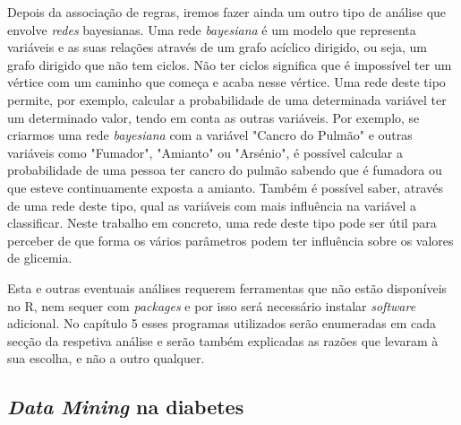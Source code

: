 Depois da associação de regras, iremos fazer ainda um outro tipo de análise que envolve \textit{redes} bayesianas. Uma rede \textit{bayesiana} é um modelo que representa variáveis e as suas relações através de um grafo acíclico dirigido, ou seja, um grafo dirigido que não tem ciclos. Não ter ciclos significa que é impossível ter um vértice com um caminho que começa e acaba nesse vértice. Uma rede deste tipo permite, por exemplo, calcular a probabilidade de uma determinada variável ter um determinado valor, tendo em conta as outras variáveis. Por exemplo, se criarmos uma rede \textit{bayesiana} com a variável "Cancro do Pulmão" e outras variáveis como "Fumador", "Amianto" ou "Arsénio", é possível calcular a probabilidade de uma pessoa ter cancro do pulmão sabendo que é fumadora ou que esteve continuamente exposta a amianto. Também é possível saber, através de uma rede deste tipo, qual as variáveis com mais influência na variável a classificar. Neste trabalho em concreto, uma rede deste tipo pode ser útil para perceber de que forma os vários parâmetros podem ter influência sobre os valores de glicemia.

Esta e outras eventuais análises requerem ferramentas que não estão disponíveis no R, nem sequer com \textit{packages} e por isso será necessário instalar \textit{software} adicional. No capítulo 5 esses programas utilizados serão enumeradas em cada secção da respetiva análise e serão também explicadas as razões que levaram à sua escolha, e não a outro qualquer.

\subsection{\textit{Data Mining} na diabetes}

